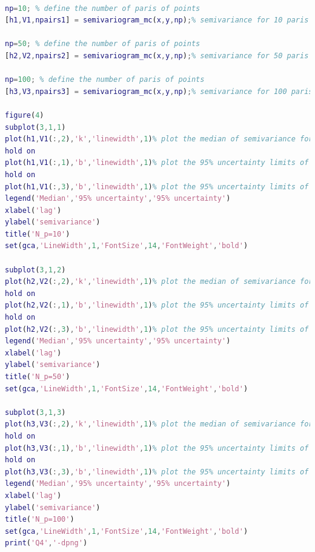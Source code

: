 \documentclass[
	12pt, %
]{fphw}
\begin{document}
\begin{lstlisting}[language=Matlab,escapeinside=``]

np=10; % define the number of paris of points
[h1,V1,npairs1] = semivariogram_mc(x,y,np);% semivariance for 10 paris

np=50; % define the number of paris of points
[h2,V2,npairs2] = semivariogram_mc(x,y,np);% semivariance for 50 paris

np=100; % define the number of paris of points
[h3,V3,npairs3] = semivariogram_mc(x,y,np);% semivariance for 100 paris

figure(4)
subplot(3,1,1)
plot(h1,V1(:,2),'k','linewidth',1)% plot the median of semivariance for 10 paris
hold on
plot(h1,V1(:,1),'b','linewidth',1)% plot the 95% uncertainty limits of semivariance for 10 paris
hold on
plot(h1,V1(:,3),'b','linewidth',1)% plot the 95% uncertainty limits of semivariance for 10 paris
legend('Median','95% uncertainty','95% uncertainty')
xlabel('lag')
ylabel('semivariance')
title('N_p=10')
set(gca,'LineWidth',1,'FontSize',14,'FontWeight','bold')

subplot(3,1,2)
plot(h2,V2(:,2),'k','linewidth',1)% plot the median of semivariance for 50 paris
hold on
plot(h2,V2(:,1),'b','linewidth',1)% plot the 95% uncertainty limits of semivariance for 50 paris
hold on
plot(h2,V2(:,3),'b','linewidth',1)% plot the 95% uncertainty limits of semivariance for 50 paris
legend('Median','95% uncertainty','95% uncertainty')
xlabel('lag')
ylabel('semivariance')
title('N_p=50')
set(gca,'LineWidth',1,'FontSize',14,'FontWeight','bold')

subplot(3,1,3)
plot(h3,V3(:,2),'k','linewidth',1)% plot the median of semivariance for 100 paris
hold on
plot(h3,V3(:,1),'b','linewidth',1)% plot the 95% uncertainty limits of semivariance for 100 paris
hold on
plot(h3,V3(:,3),'b','linewidth',1)% plot the 95% uncertainty limits of semivariance for 100 paris
legend('Median','95% uncertainty','95% uncertainty')
xlabel('lag')
ylabel('semivariance')
title('N_p=100')
set(gca,'LineWidth',1,'FontSize',14,'FontWeight','bold')
print('Q4','-dpng')

\end{lstlisting}
\end{document}
